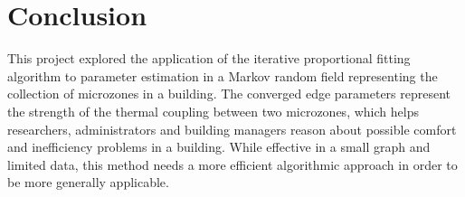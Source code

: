\section{Conclusion}

This project explored the application of the iterative proportional fitting algorithm to parameter estimation in a Markov random field representing the collection of microzones in a building.
The converged edge parameters represent the strength of the thermal coupling between two microzones, which helps researchers, administrators and building managers reason about possible comfort and inefficiency problems in a building.
While effective in a small graph and limited data, this method needs a more efficient algorithmic approach in order to be more generally applicable.
